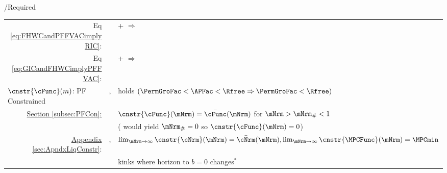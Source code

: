 \documentclass[\econtexRoot/BufferStockTheory]{subfiles}
\providecommand{\TblName}{}
\renewcommand{\TblName}{Required}
\begin{document}
\begin{verbatimwrite}{\TableDir/\TblName}
\begin{table}
{\begin{tabular}{|l|l|l|}
        \\ \multicolumn{1}{|r|}{Eq \eqref{eq:FHWCandPFFVACimplyRIC}:}                                                                              &                                         & {\PFFVAC}+{\FHWC} $\Rightarrow$ {\RIC}         
        \\ \multicolumn{1}{|r|}{{Eq \eqref{eq:GICandFHWCimplyPFFVAC}}:}                                                                              &                                         & {\GICRaw}+{\FHWC} $\Rightarrow$ {\PFFVAC}         
        \\ \hline\hline \multicolumn{1}{|l|}{$\cnstr{\cFunc}(m)$: PF Constrained}                                              & \cncl{\GICRaw}, \RIC                    & {\FHWC} holds $(\PermGroFac < \APFac < \Rfree \Rightarrow \PermGroFac < \Rfree)$
        \\
        \multicolumn{1}{|r|}{\href{https://\owner.github.io/BufferStockTheory\#PF-Constrained-Solution}{Section \ref{subsec:PFCon}:}}                &                                         & $\cnstr{\cFunc}(\mNrm)=\bar{\cFunc}(\mNrm)$ for $\mNrm > \mNrm_{\#} < 1$
        \\                                                                                                                        &                                         & (\cncl{\RIC} would yield $\mNrm_{\#}=0$ so $\cnstr{\cFunc}(\mNrm)=0$)
        \\ \cline{2-3}  \multicolumn{1}{|r|}{\href{https://\owner.github.io/BufferStockTheory\#ApndxLiqConstr}{Appendix \ref{sec:ApndxLiqConstr}}:} & \GICRaw,\RIC                            & $\lim_{\mNrm \rightarrow \infty} \cnstr{\cNrm}(\mNrm)=\bar{\cNrm}(\mNrm), \lim_{\mNrm \rightarrow \infty} \cnstr{\MPCFunc}(\mNrm)=\MPCmin$                                                                                                                                                                       
        \\                                                                                                                        &                                         & kinks where horizon to $b=0$ changes$^{\ast}$

\end{tabular}}
\end{table}
\end{verbatimwrite}
\end{document}
